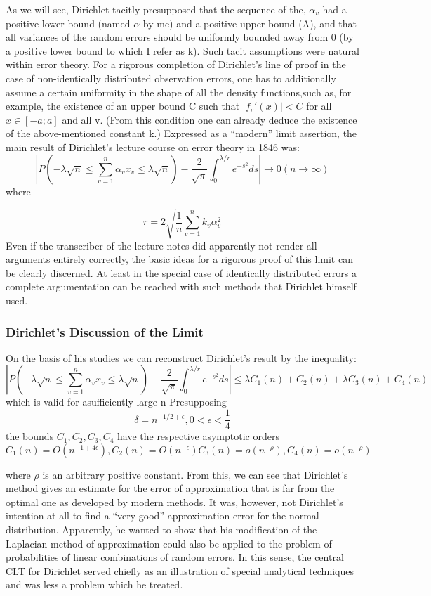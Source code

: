 \documentclass{article}
\begin{document}
As we will see, Dirichlet tacitly presupposed that
the sequence of the, $\alpha_v$ had a positive lower bound (named $\alpha$ by me) and a positive upper bound (A), and that all variances of the random errors should be uniformly bounded away from 0 (by a positive lower bound to which I refer as k). Such tacit assumptions were natural within error theory. For a rigorous completion of Dirichlet’s line of proof in the case of non-identically distributed observation errors, one has to additionally assume a certain uniformity in the shape of all the density functions,such as, for example, the existence of an upper bound C such that $|f_v'(x)|< C $ for all $ x \in [-a;a] $ and all v. (From this condition one can already deduce the existence of the above-mentioned constant k.)
Expressed as a “modern” limit assertion, the main result of Dirichlet’s lecture
course on error theory in 1846 was:
\[ |P(-\lambda\sqrt{n} \leq \sum_{v=1}^n  \alpha_v x_v \leq \lambda \sqrt{n})-\frac{2}{\sqrt{\pi}}\int_0^{\lambda /r} e^{-s^2} ds|  \rightarrow  0 (n \rightarrow \infty)\]
where

\[r= 2 \sqrt{\frac{1}{n}\sum_{v=1}^n k_v \alpha_v^2 }\]
Even if the transcriber of the lecture notes did apparently not render all arguments
entirely correctly, the basic ideas for a rigorous proof of this limit can be clearly
discerned. At least in the special case of identically distributed errors a complete
argumentation can be reached with such methods that Dirichlet himself used.


\subsubsection{ Dirichlet’s Discussion of the Limit}
On the basis of his studies  we can reconstruct Dirichlet’s result by the inequality:
\[ | P(- \lambda \sqrt{n} \leq \sum_{v=1}^n \alpha_v x_v \leq \lambda\sqrt{n}  ) - \frac{2}{\sqrt{\pi}} \int_0^{\lambda/r} e^{-s^2} ds  |   \leq \lambda C_1(n) +C_2(n)+\lambda C_3(n) +C_4(n) \]
which is valid for asufficiently large n Presupposing 
\[ \delta = n^{-1/2 +\epsilon}, 0< \epsilon < \frac{1}{4} \]
the bounds $C_1, C_2,C_3,C_4 $ have the respective asymptotic orders 
\[C_1(n)= O(n^{-1+4\epsilon}),C_2(n)= O(n^{-\epsilon}) C_3(n)= o(n^{-\rho}), C_4(n)=o(n^{-\rho})\]

where $\rho $ is an arbitrary positive constant. From this, we can see that Dirichlet’s method gives an estimate for the error of approximation that is far from the optimal one as developed by modern methods. 
It was, however, not Dirichlet’s intention at
all to find a “very good” approximation error for the normal distribution. Apparently, he wanted to show that his modification of the Laplacian method of approximation could also be applied to the problem of probabilities of linear combinations of random errors.
In this sense, the central CLT for Dirichlet served chiefly as an illustration of special analytical techniques and was less a problem which he treated. 
\end{document}
